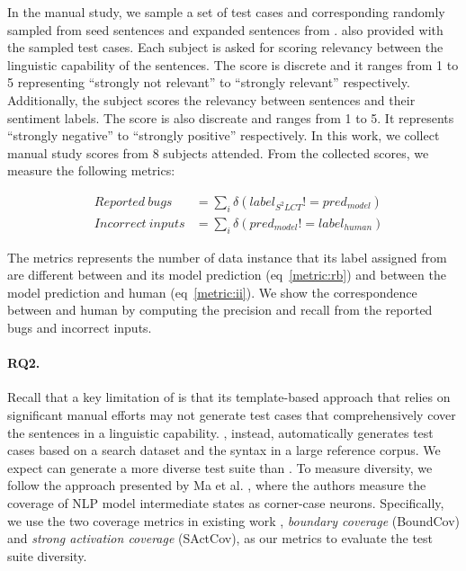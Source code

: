 
In the manual study, we sample a set of test cases and corresponding
\lc randomly sampled from seed sentences and expanded sentences from
\tool.  also provided with the sampled test cases. Each subject is
asked for scoring relevancy between the linguistic capability of the
sentences. The score is discrete and it ranges from 1 to 5
representing ``strongly not relevant'' to ``strongly relevant''
respectively. Additionally, the subject scores the relevancy between
sentences and their sentiment labels. The score is also discreate and
ranges from 1 to 5. It represents ``strongly negative'' to ``strongly
positive'' respectively. In this work, we collect manual study scores
from 8 subjects attended. From the collected scores, we measure the
following metrics:

\begin{eqnarray}
  &Reported\:bugs &=\sum_{i} \delta(label_{S^2LCT}!=pred_{model}) \label{metric:rb}\\
  &Incorrect\:inputs &= \sum_{i} \delta(pred_{model}!=label_{human}) \label{metric:ii}
\end{eqnarray}

The metrics represents the number of data instance that its label
assigned from are different between \tool and its model prediction
(eq~\ref{metric:rb}) and between the model prediction and human
(eq~\ref{metric:ii}). We show the correspondence between \tool and
human by computing the precision and recall from the reported bugs and
incorrect inputs.

\paragraph{RQ2.}
Recall that a key limitation of \Cklst is that its template-based
approach that relies on significant manual efforts may not generate test cases that comprehensively cover the sentences
in a linguistic capability. \tool, instead, automatically generates test cases based on a search
dataset and the syntax in a large reference corpus. We expect \tool can generate a more diverse test suite
than \Cklst. To measure diversity, we follow the approach presented by Ma et al. \cite{ma2018deepgauge},
where the authors measure the coverage of NLP model intermediate states as corner-case neurons.
Specifically, we use the   two coverage metrics in existing work \cite{ma2018deepgauge}, \textit{boundary coverage} (BoundCov) and \textit{strong activation coverage} (SActCov), as our metrics to evaluate the test suite diversity.

